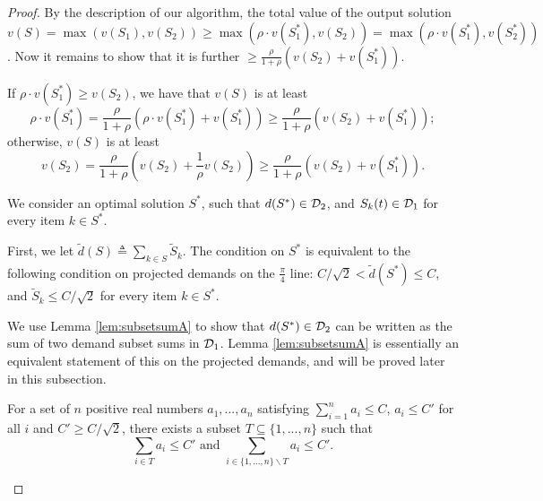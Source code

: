 \begin{proof}
By the description of our algorithm, the total value of the output solution $v(S)=\max(v({S_1}), v({S_2}))\geq \max(\rho\cdot v({S_1^*}), v({S_2}))= \max(\rho\cdot v({S_1^*}), v({S_2^*}))$.  Now it remains to show that it is further $\geq \frac{\rho}{1+\rho}(v({S_2})+v({S_1^*}))$.

If $\rho\cdot v({S_1^*})\geq v({S_2})$, we have that $v(S)$ is at least 
\begin{equation*}
\rho\cdot v({S_1^*})= \frac{\rho}{1+\rho}(\rho\cdot v({S_1^*})+v({S_1^*}))
\geq \frac{\rho}{1+\rho}( v({S_2})+v({S_1^*}));
\end{equation*}
otherwise, $v(S)$ is at least  
\begin{equation*}
v({S_2})= \frac{\rho}{1+\rho}(v({S_2})+\frac{1}{\rho}v({S_2}))\geq \frac{\rho}{1+\rho}( v({S_2})+v({S_1^*})).
\end{equation*}


 We consider an optimal solution $S^\ast$, such that $d({S^\ast})\in {\cal D}_2$, and $S_k(t)\in {\cal D}_1$ for every item $k\in S^\ast$.

First, we let $\tilde{d}(S) \triangleq \sum_{k\in S} \tilde{S}_k$.  The condition on $S^{\ast}$ is equivalent to the following condition on 
projected demands on the $\frac{\pi}{4}$ line: $C/\sqrt{2}<\tilde{d}({S^\ast}) \leq C$, and $\tilde{S}_k \le  C/\sqrt{2}$ for every item $k\in S^\ast$.

We use Lemma \ref{lem:subsetsumA} to show that $d({S^\ast})\in {\cal D}_2$ can be written as the sum of two demand subset sums in ${\cal D}_1$.  Lemma \ref{lem:subsetsumA} is essentially an equivalent statement of this on the projected demands, and will be proved later in this subsection.     

\begin{lemma} \label{lem:subsetsumA}
For a set of $n$ positive real numbers $a_1, ..., a_n$ satisfying $\sum_{i = 1}^n a_i \le C$,  $a_i \le C'$ for all $i$ and $C'\ge C/\sqrt{2}$, there exists a subset $T \subseteq \{1,...,n\}$ such that
\begin{equation*}
\sum_{i \in T} a_i \le C' \mbox{\ \ and \ \ } \sum_{i \in \{1,...,n\} \backslash T} a_i \le C'.
\end{equation*}
\end{lemma}


\end{proof}
